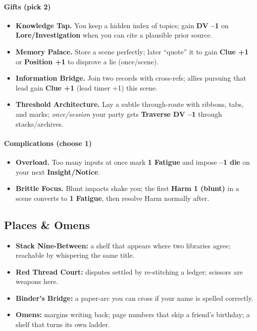 \documentclass[11pt]{book}
\begin{document}
\paragraph{Gifts (pick 2)}
\begin{itemize}
    \item \textbf{Knowledge Tap.} You keep a hidden index of topics; gain \textbf{DV --1} on \textbf{Lore/Investigation} when you can cite a plausible prior source.
    \item \textbf{Memory Palace.} Store a scene perfectly; later ``quote'' it to gain \textbf{Clue +1} or \textbf{Position +1} to disprove a lie (once/scene).
    \item \textbf{Information Bridge.} Join two records with cross-refs; allies pursuing that lead gain \textbf{Clue +1} (lead timer +1) this scene.
    \item \textbf{Threshold Architecture.} Lay a subtle through-route with ribbons, tabs, and marks; \emph{once/session} your party gets \textbf{Traverse DV --1} through stacks/archives.
\end{itemize}

\paragraph{Complications (choose 1)}
\begin{itemize}
    \item \textbf{Overload.} Too many inputs at once mark \textbf{1 Fatigue} and impose \textbf{--1 die} on your next \textbf{Insight/Notice}.
    \item \textbf{Brittle Focus.} Blunt impacts shake you; the first \textbf{Harm 1 (blunt)} in a scene converts to \textbf{1 Fatigue}, then resolve Harm normally after.
\end{itemize}

\subsection*{Places \& Omens}
\begin{itemize}
    \item \textbf{Stack Nine-Between:} a shelf that appears where two libraries agree; reachable by whispering the same title.
    \item \textbf{Red Thread Court:} disputes settled by re-stitching a ledger; scissors are weapons here.
    \item \textbf{Binder's Bridge:} a paper-arc you can cross if your name is spelled correctly.
    \item \textbf{Omens:} margins writing back; page numbers that skip a friend's birthday; a shelf that turns its own ladder.
\end{itemize}
\end{document}
